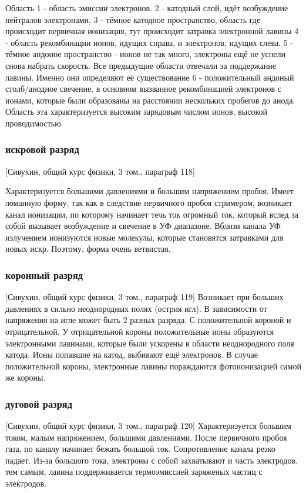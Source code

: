 \documentclass[10pt, a4paper]{article}
\begin{document}
Область 1 - область эмиссии электронов. 2 - катодный слой, идёт возбуждение нейтралов электронами, 3 - тёмное катодное пространство, область где происходит первичная ионизация, тут происходит затравка электронной лавины 4 - область рекомбинации ионов, идущих справа, и электронов, идущих слева. 5 - тёмное андоное пространство - ионов не так много, электроны ещё не успели снова набрать скорость. Все предыдущие области отвечали за поддержание лавины. Именно они определяют её существование  6 - положительный андоный столб/анодное свечение, в основном вызванное рекомбинацией электронов с ионами, которые были образованы на расстоянии нескольких пробегов до анода. Область эта характеризуется высоким зарядовым числом ионов, высокой проводимостью.
\subsubsection{искровой разряд}
[Сивухин, общий курс физики, 3 том., параграф 118]

Характеризуется большими давлениями и большим напряжением пробоя.
Имеет ломанную форму, так как в следствие первичного пробоя стримером, возникает канал ионизации, по которому начинает течь ток огромный ток, который вслед за собой вызывает возбуждение и свечение в УФ диапазоне. Вблизи канала УФ излучением ионизуются новые молекулы, которые становятся затравками для новых искр. Поэтому, форма очень ветвистая.

\subsubsection{коронный разряд}
[Сивухин, общий курс физики, 3 том., параграф 119]
Возникает при больших давлениях в сильно неоднородных полях (острия игл). В зависимости от напряжения на игле может быть 2 разных разряда. С положительной короной и отрицательной.
У отрицательной короны положительные ионы образуются электронными лавинами, которые были ускорены в области неоднородного поля катода. Ионы попавшие на катод, выбивают ещё электронов.
В случае положительной короны,  электронные лавины пораждаются фотоионизацией самой же короны.

\subsubsection{дуговой разряд}
[Сивухин, общий курс физики, 3 том., параграф 120]
Характеризуется большим током, малым напряжением, большими давлениями.
После первичного пробоя газа, по каналу начинает бежать большой ток. Сопротивление канала резко падает. Из-за большого тока, электроны с собой захватывают и часть электродов. тем самым, лавина поддерживается термоэмиссией заряженых частиц с электродов.
\end{document}
